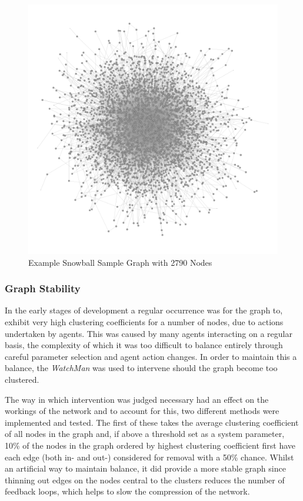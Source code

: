 \documentclass[]{report}
\begin{document}
\begin{figure}
\begin{center}
\includegraphics[scale=0.4]{ex-snowball.png}
\end{center}
\caption{Example Snowball Sample Graph with 2790 Nodes}
\label{img:ex-snowball}
\end{figure}

\subsubsection{Graph Stability}
In the early stages of development a regular occurrence was for the graph to, exhibit very high clustering coefficients for a number of nodes, due to actions undertaken by agents. This was caused by many agents interacting on a regular basis, the complexity of which it was too difficult to balance entirely through careful parameter selection and agent action changes. In order to maintain this a balance, the \emph{WatchMan} was used to intervene should the graph become too clustered.

The way in which intervention was judged necessary had an effect on the workings of the network and to account for this, two different methods were implemented and tested. The first of these takes the average clustering coefficient of all nodes in the graph and, if above a threshold set as a system parameter, 10\% of the nodes in the graph ordered by highest clustering coefficient first have each edge (both in- and out-) considered for removal with a 50\% chance. Whilst an artificial way to maintain balance, it did provide a more stable graph since thinning out edges on the nodes central to the clusters reduces the number of feedback loops, which helps to slow the compression of the network.
\end{document}
